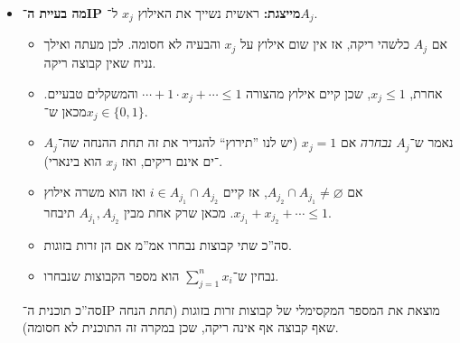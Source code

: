 \documentclass[]{../../../../tex/classes/homework}
\begin{document}
\begin{enumerate}[(A)]
\begin{itemize}
			\textit{הערה: }נבחין שאם $A_1 \dots A_m$ איננו כיסוי של $S$, אז קיים $i \in [n]$ כך ש־$i \notin A_j$ לאף $j$, ואז הוא משרה אילוץ טאוטולוגי ($0 \le 1$) שנוכל להתעלם ממנו. כך נפעל לכל $i \in S = [n]$ ש־$A_1 \dots A_m$ לא מכסים. 
			\item \textbf{מה בעיית ה־IP מייצגת: }ראשית נשייך את האילוץ $x_j$ ל־$A_j$. 
			\begin{itemize}
				\item אם $A_j$ כלשהי ריקה, אז אין שום אילוץ על $x_j$ והבעיה לא חסומה. לכן מעתה ואילך נניח שאין קבוצה ריקה. 
				\item אחרת, $x_j \le 1$, שכן קיים אילוץ מהצורה $\cdots + 1 \cdot x_j + \cdots \le 1$ והמשקלים טבעיים. מכאן ש־$x_j \in \{0, 1\}$. 
				\item נאמר ש־$A_j$ \textit{נבחרה} אם $x_j = 1$ (יש לנו ''תירוץ`` להגדיר את זה תחת ההנחה שה־$A_j$־ים אינם ריקים, ואז $x_j$ הוא בינארי). 
				\item אם $A_{j_2} \cap A_{j_1} \neq \varnothing$, אז קיים $i \in A_{j_1} \cap A_{j_2}$ ואז הוא משרה אילוץ $x_{j_1} + x_{j_2} + \cdots \le 1$. מכאן שרק אחת מבין $A_{j_1}, A_{j_2}$ תיבחר. 
				\item סה''כ שתי קבוצות נבחרו אמ''מ אם הן זרות בזוגות. 
				\item נבחין ש־$\sum_{j = 1}^{n}x_i$ הוא מספר הקבוצות שנבחרו. 
			\end{itemize}
			סה''כ תוכנית ה־IP מוצאת את המספר המקסימלי של קבוצות זרות בזוגות (תחת הנחה שאף קבוצה אף אינה ריקה, שכן במקרה זה התוכנית לא חסומה). 
		\end{itemize}	
	\end{enumerate}
	
	\npage
\end{document}
